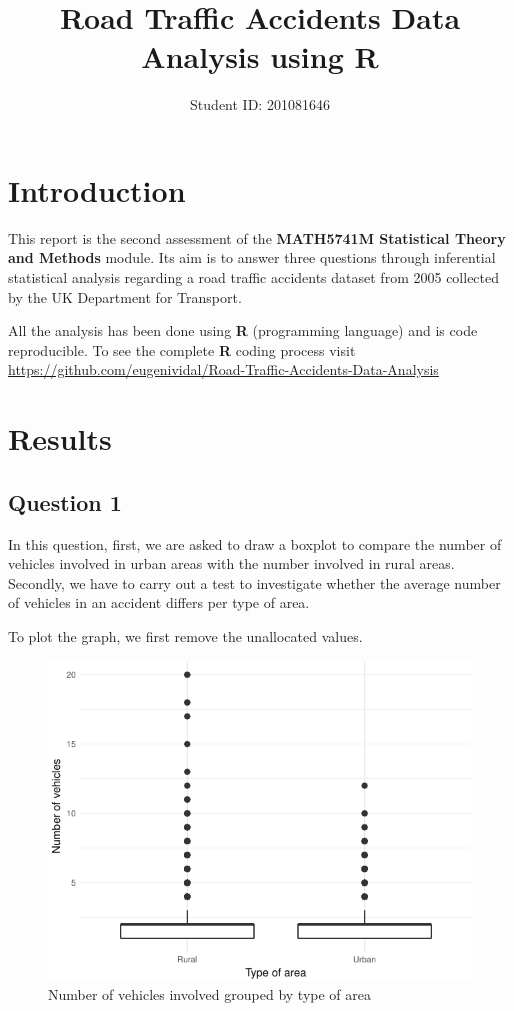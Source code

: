 \documentclass[]{article}
\title{Road Traffic Accidents Data Analysis using R}
\author{Student ID: 201081646}
\date{}
\begin{document}
\maketitle

\section{Introduction}\label{introduction}

This report is the second assessment of the \textbf{MATH5741M
Statistical Theory and Methods} module. Its aim is to answer three
questions through inferential statistical analysis regarding a road
traffic accidents dataset from 2005 collected by the UK Department for
Transport.

All the analysis has been done using \textbf{R} (programming language)
and is code reproducible. To see the complete \textbf{R} coding process
visit
\url{https://github.com/eugenividal/Road-Traffic-Accidents-Data-Analysis}

\section{Results}\label{results}

\subsection{Question 1}\label{question-1}

In this question, first, we are asked to draw a boxplot to compare the
number of vehicles involved in urban areas with the number involved in
rural areas. Secondly, we have to carry out a test to investigate
whether the average number of vehicles in an accident differs per type
of area.

To plot the graph, we first remove the unallocated values.

\begin{figure}[H]

{\centering \includegraphics{READMEv4_files/figure-latex/fig-1} 

}

\caption{Number of vehicles involved grouped by type of area}\label{fig:fig}
\end{figure}
\end{document}
